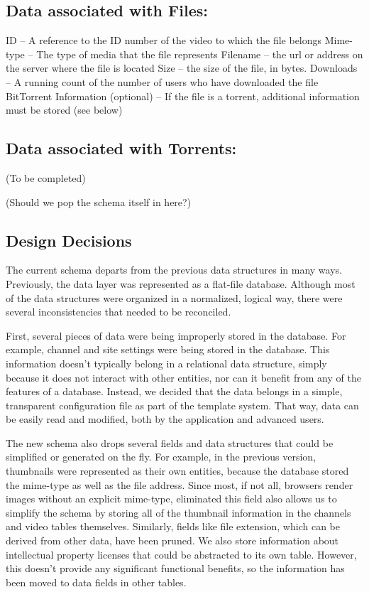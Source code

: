 \documentclass[a4paper,12pt]{report}
\begin{document}
\subsection{Data associated with Files:}
ID – A reference to the ID number of the video to which the file belongs
Mime-type – The type of media that the file represents
Filename – the url or address on the server where the file is located
Size – the size of the file, in bytes.
Downloads – A running count of the number of users who have downloaded the file
BitTorrent Information (optional) – If the file is a torrent, additional information must be stored (see below)

\subsection{Data associated with Torrents:}
(To be completed)

(Should we pop the schema itself in here?)

\subsection{Design Decisions}
The current schema departs from the previous data structures in many ways. Previously, the data layer was represented as a flat-file database. 
Although most of the data structures were organized in a normalized, logical way, there were several inconsistencies that needed to be reconciled.

First, several pieces of data were being improperly stored in the database. For example, channel and site settings were being stored in the database. This information doesn't typically belong in a relational data structure, simply because it does not interact with other entities, nor can it benefit from any of the features of a database. 
Instead, we decided that the data belongs in a simple, transparent configuration file as part of the template system. 
That way, data can be easily read and modified, both by the application and advanced users. 

The new schema also drops several fields and data structures that could be simplified or generated on the fly. 
For example, in the previous version, thumbnails were represented as their own entities, because the database stored the mime-type as well as the file address. 
Since most, if not all, browsers render images without an explicit mime-type, eliminated this field also allows us to simplify the schema by storing all of the thumbnail information in the channels and video tables themselves. Similarly, fields like file extension, which can be derived from other data, have been pruned. 
We also store information about intellectual property licenses that could be abstracted to its own table. 
However, this doesn't provide any significant functional benefits, so the information has been moved to data fields in other tables.
\end{document}
